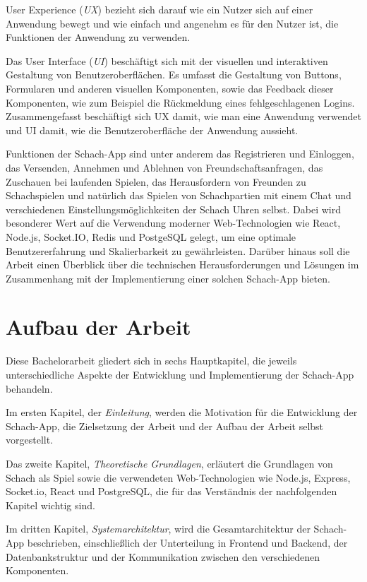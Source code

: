 \documentclass[a4paper,12pt]{report}
\newcommand{\footcite}[1]{\footnotemark\footnotetext{\cite{#1}}}
\begin{document}
    User Experience (\textit{UX}) bezieht sich darauf wie ein Nutzer sich auf einer Anwendung bewegt und wie einfach und angenehm es für den Nutzer ist, die Funktionen der Anwendung zu verwenden.
    
    Das User Interface (\textit{UI}) beschäftigt sich mit der visuellen und interaktiven Gestaltung von Benutzeroberflächen. Es umfasst die Gestaltung von Buttons, Formularen und anderen visuellen Komponenten, sowie das Feedback dieser Komponenten, wie zum Beispiel die Rückmeldung eines fehlgeschlagenen Logins.
    Zusammengefasst beschäftigt sich UX damit, wie man eine Anwendung verwendet und UI damit, wie die Benutzeroberfläche der Anwendung aussieht.\footcite{webdesign}
        
        Funktionen der Schach-App sind unter anderem das Registrieren und Einloggen, das Versenden, Annehmen und Ablehnen von Freundschaftsanfragen, das Zuschauen bei laufenden Spielen, das Herausfordern von Freunden zu Schachspielen und natürlich das Spielen von Schachpartien mit einem Chat und verschiedenen Einstellungsmöglichkeiten der Schach Uhren selbst.
    Dabei wird besonderer Wert auf die Verwendung moderner Web-Technologien wie React, Node.js, Socket.IO, Redis und PostgeSQL gelegt, um eine optimale Benutzererfahrung und Skalierbarkeit zu gewährleisten. Darüber hinaus soll die Arbeit einen Überblick über die technischen Herausforderungen und Lösungen im Zusammenhang mit der Implementierung einer solchen Schach-App bieten.
    
    \section{Aufbau der Arbeit}
Diese Bachelorarbeit gliedert sich in sechs Hauptkapitel, die jeweils unterschiedliche Aspekte der Entwicklung und Implementierung der Schach-App behandeln.

Im ersten Kapitel, der \textit{Einleitung}, werden die Motivation für die Entwicklung der Schach-App, die Zielsetzung der Arbeit und der Aufbau der Arbeit selbst vorgestellt.

Das zweite Kapitel, \textit{Theoretische Grundlagen}, erläutert die Grundlagen von Schach als Spiel sowie die verwendeten Web-Technologien wie Node.js, Express, Socket.io, React und PostgreSQL, die für das Verständnis der nachfolgenden Kapitel wichtig sind.

Im dritten Kapitel, \textit{Systemarchitektur}, wird die Gesamtarchitektur der Schach-App beschrieben, einschließlich der Unterteilung in Frontend und Backend, der Datenbankstruktur und der Kommunikation zwischen den verschiedenen Komponenten.
\end{document}
